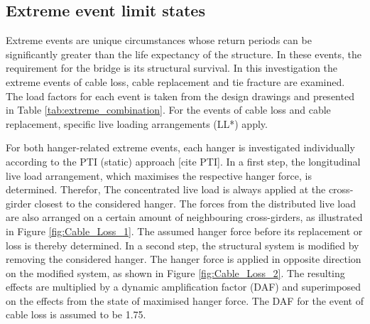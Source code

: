 \subsection{Extreme event limit states}
Extreme events are unique circumstances whose return periods can be significantly greater than the life expectancy of the structure. In these events, the requirement for the bridge is its structural survival. In this investigation the extreme events of cable loss, cable replacement and tie fracture are examined. The load factors for each event is taken from the design drawings and presented in Table \ref{tab:extreme_combination}. For the events of cable loss and cable replacement, specific live loading arrangements (LL*) apply.



For both hanger-related extreme events, each hanger is investigated individually according to the PTI (static) approach [cite PTI]. In a first step, the longitudinal live load arrangement, which maximises the respective hanger force, is determined. Therefor, The concentrated live load is always applied at the cross-girder closest to the considered hanger. The forces from the distributed live load are also arranged on a certain amount of neighbouring cross-girders, as illustrated in Figure \ref{fig:Cable_Loss_1}. The assumed hanger force before its replacement or loss is thereby determined. In a second step, the structural system is modified by removing the considered hanger. The hanger force is applied in opposite direction on the modified system, as shown in Figure \ref{fig:Cable_Loss_2}. The resulting effects are multiplied by a dynamic amplification factor (DAF) and superimposed on the effects from the state of maximised hanger force. The DAF for the event of cable loss is assumed to be 1.75.

